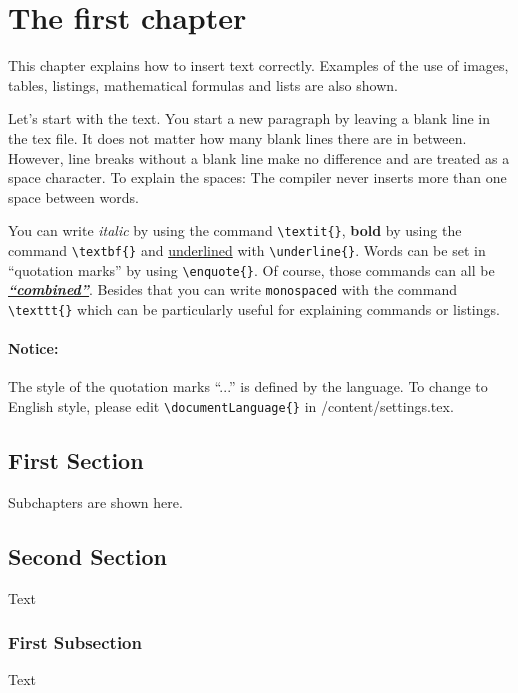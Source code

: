 \chapter{The first chapter}

This chapter explains how to insert text correctly. Examples of the use of images, tables, listings, mathematical formulas and lists are also shown.



Let's start with the text. You start a new paragraph by leaving a blank line in the tex file. It does not matter how many blank lines there are in between.
However, line breaks without a blank line make no difference and are treated as a space character. To explain the spaces: The compiler never inserts more than one      space        between words.


You can write \textit{italic} by using the command \texttt{\textbackslash{}textit\{\}}, \textbf{bold} by using the command \texttt{\textbackslash{}textbf\{\}} and \underline{underlined} with \texttt{\textbackslash{}underline\{\}}. Words can be set in \enquote{quotation marks} by using \texttt{\textbackslash{}enquote\{\}}. Of course, those commands can all be \textit{\textbf{\underline{\enquote{combined}}}}. Besides that you can write \texttt{monospaced} with the command \texttt{\textbackslash{}texttt\{\}} which can be particularly useful for explaining commands or listings.

\subsubsection{Notice:}
The style of the quotation marks \enquote{...} is defined by the language. To change to English style, please edit \texttt{\textbackslash{}documentLanguage\{\}} in /content/settings.tex.

\section{First Section}
Subchapters are shown here.

\section{Second Section}
Text

\subsection{First Subsection}
Text

